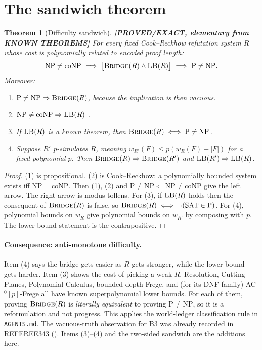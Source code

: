 \documentclass[11pt]{article}
\newtheorem{theorem}{Theorem}
\theoremstyle{remark}
\newcommand{\SAT}{\mathrm{SAT}}
\newcommand{\status}[1]{\textbf{[#1]}}
\begin{document}
\section{The sandwich theorem}
\begin{theorem}[Difficulty sandwich]\label{thm:sandwich}
\status{PROVED/EXACT, elementary from KNOWN THEOREMS} For every fixed Cook--Reckhow refutation
system $R$ whose cost is polynomially related to encoded proof length:
\[
\mathrm{NP}\ne\mathrm{coNP}\ \Longrightarrow\ \bigl[\textsc{Bridge}(R)\wedge\textsc{LB}(R)\bigr]
\ \Longrightarrow\ \mathrm P\ne\mathrm{NP}.
\]
Moreover:
\begin{enumerate}
\item $\mathrm P\ne\mathrm{NP}\Rightarrow\textsc{Bridge}(R)$, because the implication is then vacuous.
\item $\mathrm{NP}\ne\mathrm{coNP}\Rightarrow\textsc{LB}(R)$ \cite{cookreckhow1979}.
\item If $\textsc{LB}(R)$ is a known theorem, then $\textsc{Bridge}(R)\iff\mathrm P\ne\mathrm{NP}$.
\item Suppose $R'$ p-simulates $R$, meaning $w_{R'}(F)\le p(w_R(F)+|F|)$ for a fixed polynomial
$p$. Then $\textsc{Bridge}(R)\Rightarrow\textsc{Bridge}(R')$ and $\textsc{LB}(R')\Rightarrow\textsc{LB}(R)$.
\end{enumerate}
\end{theorem}
\begin{proof}
(1) is propositional. (2) is Cook--Reckhow: a polynomially bounded system exists iff
$\mathrm{NP}=\mathrm{coNP}$. Then (1), (2) and $\mathrm P\ne\mathrm{NP}\Leftarrow\mathrm{NP}\ne\mathrm{coNP}$ give
the left arrow. The right arrow is modus tollens. For (3), if $\textsc{LB}(R)$ holds then the
consequent of $\textsc{Bridge}(R)$ is false, so $\textsc{Bridge}(R)\iff\neg(\SAT\in\mathrm P)$.
For (4), polynomial bounds on $w_R$ give polynomial bounds on $w_{R'}$ by composing
with $p$. The lower-bound statement is the contrapositive.
\end{proof}

\paragraph{Consequence: anti-monotone difficulty.} Item (4) says the bridge gets easier
as $R$ gets stronger, while the lower bound gets harder. Item (3) shows the cost of picking a weak $R$.
Resolution, Cutting Planes, Polynomial Calculus, bounded-depth Frege, and (for its DNF family)
AC$^0[p]$-Frege all have known superpolynomial lower bounds. For each of them, proving
$\textsc{Bridge}(R)$ is \emph{literally equivalent} to proving $\mathrm P\ne\mathrm{NP}$, so it is
a reformulation and not progress. This applies the world-ledger classification rule in
\texttt{AGENTS.md}. The vacuous-truth observation for B3 was already recorded in REFEREE343
().
Items (3)--(4) and the two-sided sandwich are the additions here.
\end{document}
